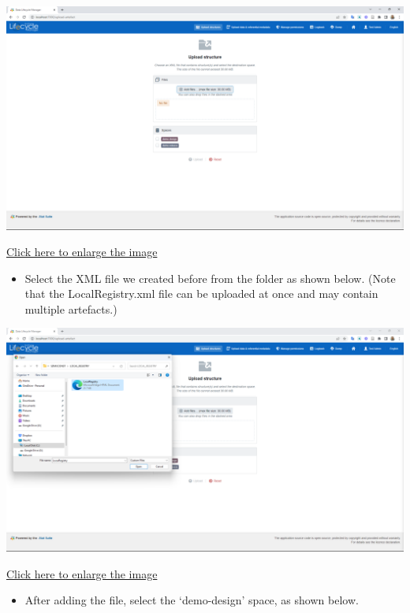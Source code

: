 \documentclass[
]{book}
\providecommand{\tightlist}{%
  \setlength{\itemsep}{0pt}\setlength{\parskip}{0pt}}
\begin{document}
\begin{center}\includegraphics[width=1\linewidth]{./images/image194} \end{center}

\href{images/image194.png}{Click here to enlarge the image}

\begin{itemize}
\tightlist
\item
  Select the XML file we created before from the folder as shown below. (Note that the LocalRegistry.xml file can be uploaded at once and may contain multiple artefacts.)
\end{itemize}

\begin{center}\includegraphics[width=1\linewidth]{./images/image196} \end{center}

\href{images/image196.png}{Click here to enlarge the image}

\begin{itemize}
\tightlist
\item
  After adding the file, select the `demo-design' space, as shown below.
\end{itemize}
\end{document}
